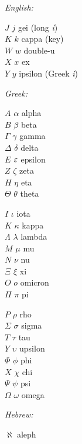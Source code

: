 \emph{English:}
\begin{center}
\begin{minipage}{3cm}
$J$ $j$ gei (long \emph{i}) \\
$K$ $k$ cappa (key) \\
$W$ $w$ double-u \\
$X$ $x$ ex \\
$Y$ $y$ ipsilon (Greek \emph{i}) 
\end{minipage}
\end{center}
%
\emph{Greek:}
\begin{center}
\begin{minipage}{3cm}
$A$ $\alpha$ alpha \index{$\alpha$} \\
$B$ $\beta$ beta \index{$\beta$}\\
$\Gamma$ $\gamma$ gamma \index{$\gamma$} \\
$\Delta$ $\delta$ delta \index{$\delta$} \\
$E$ $\eps$ epsilon \index{$\eps$} \\
$Z$ $\zeta$ zeta\footnotemark[1] \\
$H$ $\eta$ eta  \\
$\Theta$ $\theta$ theta \index{$\theta$}
\end{minipage}%
\begin{minipage}{3cm}
$I$ $\iota$ iota  \\
$K$ $\kappa$ kappa\footnotemark[2]  \\
$\Lambda$ $\lambda$ lambda \index{$\lambda$} \\
$M$ $\mu$ mu \index{$\mu$} \\
$N$ $\nu$ nu \index{$\nu$} \\
$\Xi$ $\xi$ xi  \\
$O$ $o$ omicron  \\
$\Pi$ $\pi$ pi\footnotemark[3] \index{$\pi$}
\end{minipage}%
%
\begin{minipage}{3cm}
$P$ $\rho$ rho \index{$\rho$} \\
$\Sigma$ $\sigma$ sigma \index{$\sigma$} \index{$\Sigma$} \\
$T$ $\tau$ tau  \index{$\tau$}\\
$Y$ $\upsilon$ upsilon\footnotemark[4]\\
$\Phi$ $\phi$ phi \index{$\phi$} \\
$X$ $\chi$ chi \index{$\chi$} \\
$\Psi$ $\psi$ psi \index{$\psi$} \\
$\Omega$ $\omega$ omega \index{$\omega$}
\end{minipage}
\end{center}
%
\emph{Hebrew:}
\begin{center}
\begin{minipage}{3cm}
$\aleph$ aleph
\end{minipage}
\end{center}

